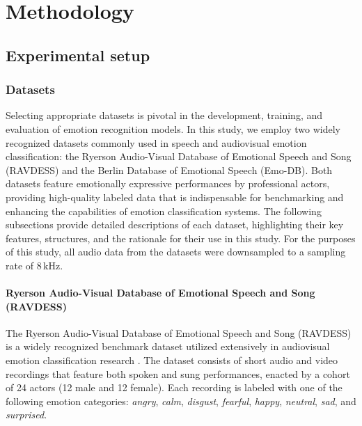 \chapter{Methodology} \label{chap:methodolo}

\section{Experimental setup}

\subsection{Datasets}

Selecting appropriate datasets is pivotal in the development, training, and evaluation of emotion recognition models. In this study, we employ two widely recognized datasets commonly used in speech and audiovisual emotion classification: the Ryerson Audio-Visual Database of Emotional Speech and Song (RAVDESS) and the Berlin Database of Emotional Speech (Emo-DB). Both datasets feature emotionally expressive performances by professional actors, providing high-quality labeled data that is indispensable for benchmarking and enhancing the capabilities of emotion classification systems. The following subsections provide detailed descriptions of each dataset, highlighting their key features, structures, and the rationale for their use in this study. For the purposes of this study, all audio data from the datasets were downsampled to a sampling rate of $8\,\text{kHz}$.

\subsubsection{Ryerson Audio-Visual Database of Emotional Speech and Song (RAVDESS)} %

The Ryerson Audio-Visual Database of Emotional Speech and Song (RAVDESS) \cite{ravdess} is a widely recognized benchmark dataset utilized extensively in audiovisual emotion classification research \cite{anusha2021, vimal2021, abdullah2020}. The dataset consists of short audio and video recordings that feature both spoken and sung performances, enacted by a cohort of 24 actors (12 male and 12 female). Each recording is labeled with one of the following emotion categories: \textit{angry}, \textit{calm}, \textit{disgust}, \textit{fearful}, \textit{happy}, \textit{neutral}, \textit{sad}, and \textit{surprised}.

